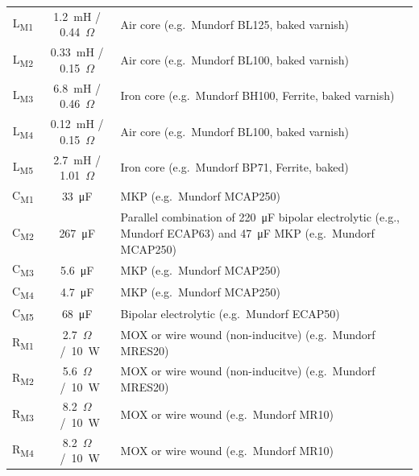 \documentclass[12pt,a4paper]{article}
\providecommand{\inductor}[1]{L\textsubscript{#1}}
\providecommand{\capacitor}[1]{C\textsubscript{#1}}
\providecommand{\resistor}[1]{R\textsubscript{#1}}
\providecommand{\Ohm}{$\Omega$}
\begin{document}
\begin{table}[p]
\begin{tabular}{ccp{}}
\inductor{M1}	& \SI{1.2}{mH} / \SI{0.44}{\Ohm}	& Air core (e.g.~Mundorf BL125, baked varnish)\\
\inductor{M2}	& \SI{0.33}{mH} / \SI{0.15}{\Ohm}	& Air core (e.g.~Mundorf BL100, baked varnish)\\
\inductor{M3}	& \SI{6.8}{mH} / \SI{0.46}{\Ohm}	& Iron core (e.g.~Mundorf BH100, Ferrite, baked varnish)\\
\inductor{M4}	& \SI{0.12}{mH} / \SI{0.15}{\Ohm}	& Air core (e.g.~Mundorf BL100, baked varnish)\\
\inductor{M5}	& \SI{2.7}{mH} / \SI{1.01}{\Ohm}	& Iron core (e.g.~Mundorf BP71, Ferrite, baked)\\
\capacitor{M1}	& \SI{33}{\micro F}			& MKP (e.g.~Mundorf MCAP250)\\
\capacitor{M2}	& \SI{267}{\micro F}			& Parallel combination of \SI{220}{\micro F} bipolar electrolytic (e.g., Mundorf ECAP63) and \SI{47}{\micro F} MKP (e.g.~Mundorf MCAP250)\\
\capacitor{M3}	& \SI{5.6}{\micro F}			& MKP (e.g.~Mundorf MCAP250)\\
\capacitor{M4}	& \SI{4.7}{\micro F}			& MKP (e.g.~Mundorf MCAP250)\\
\capacitor{M5}	& \SI{68}{\micro F}			& Bipolar electrolytic (e.g.~Mundorf ECAP50)\\
\resistor{M1}	& \SI{2.7}{\Ohm} / \SI{10}{W}		& MOX or wire wound (non-inducitve) (e.g.~Mundorf MRES20)\\
\resistor{M2}	& \SI{5.6}{\Ohm} / \SI{10}{W}		& MOX or wire wound (non-inducitve) (e.g.~Mundorf MRES20)\\
\resistor{M3}	& \SI{8.2}{\Ohm} / \SI{10}{W}		& MOX or wire wound (e.g.~Mundorf MR10)\\
\resistor{M4}	& \SI{8.2}{\Ohm} / \SI{10}{W}		& MOX or wire wound (e.g.~Mundorf MR10)\\

\midrule


\end{tabular}
\end{table}
\end{document}
